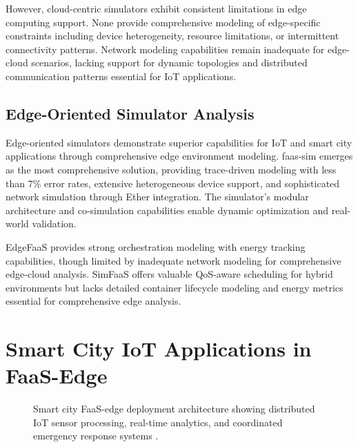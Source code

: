 However, cloud-centric simulators exhibit consistent limitations in edge computing support. None provide comprehensive modeling of edge-specific constraints including device heterogeneity, resource limitations, or intermittent connectivity patterns. Network modeling capabilities remain inadequate for edge-cloud scenarios, lacking support for dynamic topologies and distributed communication patterns essential for IoT applications.

\subsection{Edge-Oriented Simulator Analysis}

Edge-oriented simulators demonstrate superior capabilities for IoT and smart city applications through comprehensive edge environment modeling. faas-sim emerges as the most comprehensive solution, providing trace-driven modeling with less than 7\% error rates, extensive heterogeneous device support, and sophisticated network simulation through Ether integration. The simulator's modular architecture and co-simulation capabilities enable dynamic optimization and real-world validation.

EdgeFaaS provides strong orchestration modeling with energy tracking capabilities, though limited by inadequate network modeling for comprehensive edge-cloud analysis. SimFaaS offers valuable QoS-aware scheduling for hybrid environments but lacks detailed container lifecycle modeling and energy metrics essential for comprehensive edge analysis.

\section{Smart City IoT Applications in FaaS-Edge}

\begin{figure}[htbp]
\centering
{}
\caption{Smart city FaaS-edge deployment architecture showing distributed IoT sensor processing, real-time analytics, and coordinated emergency response systems \cite{wang2021edgeserve, boughzala2022faassim}.}
\label{fig:smart-city-deployment}
\end{figure}


